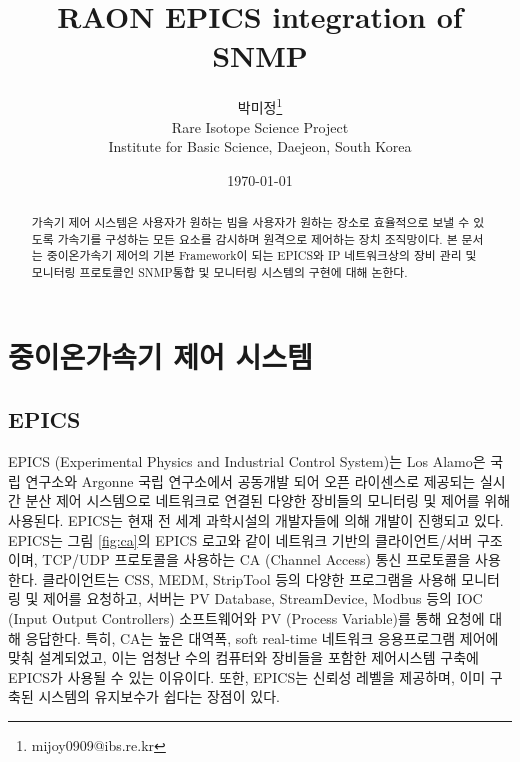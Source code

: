 \documentclass[11pt
  , a4paper
  , article
  , oneside
]{memoir}
\begin{document}
 
\newcommand{\technumber}{
  RAON Control-Document Series\\
  Revision : v0.1,   Release : Mar. 12. 2015}
\title{\textbf{RAON EPICS integration of SNMP}}

\author{박미정\thanks{mijoy0909@ibs.re.kr} \\

  Rare Isotope Science Project\\
  Institute for Basic Science, Daejeon, South Korea
}
\date{\today}


\renewcommand{\maketitlehooka}{\begin{flushright}\textsf{\technumber}\end{flushright}}

\maketitle

\begin{abstract}
가속기 제어 시스템은 사용자가 원하는 빔을 사용자가 원하는 장소로 효율적으로 보낼 수 있도록 가속기를 구성하는 모든 요소를 감시하며 원격으로 제어하는 장치 조직망이다. 본 문서는 중이온가속기 제어의 기본 Framework이 되는 EPICS와 IP 네트워크상의 장비 관리 및 모니터링 프로토콜인 SNMP통합 및 모니터링 시스템의 구현에 대해 논한다.
\end{abstract}

\chapter{중이온가속기 제어 시스템}

\section{EPICS}
EPICS (Experimental Physics and Industrial Control System)는 Los Alamo은 국립 연구소와 Argonne 국립 연구소에서 공동개발 되어 오픈 라이센스로 제공되는 실시간 분산 제어 시스템으로 네트워크로 연결된 다양한 장비들의 모니터링 및 제어를 위해 사용된다. EPICS는 현재 전 세계 과학시설의 개발자들에 의해 개발이 진행되고 있다. EPICS는 그림 \ref{fig:ca}의 EPICS 로고와 같이 네트워크 기반의 클라이언트/서버 구조이며, TCP/UDP 프로토콜을 사용하는 CA (Channel Access) 통신 프로토콜을 사용한다. 클라이언트는 CSS, MEDM, StripTool 등의 다양한 프로그램을 사용해 모니터링 및 제어를 요청하고, 서버는 PV Database, StreamDevice, Modbus 등의 IOC (Input Output Controllers) 소프트웨어와 PV (Process Variable)를 통해 요청에 대해 응답한다. 특히, CA는 높은 대역폭, soft real-time 네트워크 응용프로그램 제어에 맞춰 설계되었고, 이는 엄청난 수의 컴퓨터와 장비들을 포함한 제어시스템 구축에 EPICS가 사용될 수 있는 이유이다. 또한, EPICS는 신뢰성 레벨을 제공하며, 이미 구축된 시스템의 유지보수가 쉽다는 장점이 있다\citep{epics}. 
\end{document}
